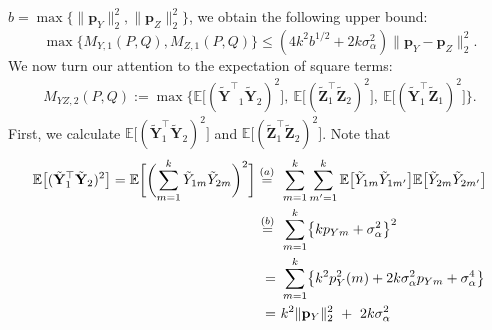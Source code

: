 \documentclass[twoside,11pt]{article}
\newcommand{\rvTwo}{Y}
\newcommand{\rvThree}{Z}
\newcommand{\vectorize}[1]{\mathbf{#1}}
\newcommand{\rvZ}{Z}
\newcommand{\rVecZ}{\vectorize{\rvZ}}
\newcommand{\rVecZPriv}{\tilde{\rVecZ}} %
\newcommand{\mE}{\mathbb{E}} %
\newcommand{\alphabetSize}{k} %
\newcommand{\vectorIndex}{m}
\newcommand{\probVecElement}[2]{p_{{#1}{#2}}}
\newcommand{\probVec}{\mathbf{p}} %
\newcommand{\kernelMoment}{M} %
\newcommand{\dataGenDist}{P}  %
\newcommand{\privacyMechanism}{Q}
\newcommand{\privacyParameter}{\alpha} %
\newcommand{\LapUParam}{\sigma_{\privacyParameter}}
\newcommand{\momentTwosampleVarCondexpY}{\kernelMoment_{\rvTwo,1}(\dataGenDist, \privacyMechanism)}
\newcommand{\momentTwosampleVarCondexpZ}{\kernelMoment_{\rvThree,1}(\dataGenDist, \privacyMechanism)}
\newcommand{\momentTwosampleExpSquare}{\kernelMoment_{\rvTwo \rvThree,2}(\dataGenDist, \privacyMechanism)}
\begin{document}
\begin{appendix}
\begin{itemize}
	${b} = \max\{ \|\probVec_Y\|_2^2, \|\probVec_Z\|_2^2 \}$,
	we obtain the following upper bound:
	\begin{equation}\label{upper_lapu_moment1}
		\max
		\{
		\momentTwosampleVarCondexpY,
		\momentTwosampleVarCondexpZ
		\}
		\leq
		(4{\alphabetSize}^2 {b}^{1/2} + {2\alphabetSize}
		\LapUParam^2) \|\probVec_\rvTwo - \probVec_\rvThree\|_2^2.
	\end{equation}
	We now turn our attention to the expectation of square terms:
	\begin{align*}
		\momentTwosampleExpSquare:=
		\max \bigl\{
		\mE
		\bigl[
		(
		{\tilde{\vectorize{\rvTwo}}^\top }_1
		\tilde{\vectorize{\rvTwo}}_2
		)^2
		\bigr],~
		\mE
		\bigl[
		(
		\tilde{\vectorize{\rvThree}}_1^\top
		\rVecZPriv_2)^2
		\bigr]
		,~
		\mE
		\bigl[
		(
		\tilde{\vectorize{\rvTwo}}_1^\top
		\rVecZPriv_1)^2
		\bigr]
		\bigr\}.
	\end{align*}
	First, we calculate
	$\mE \bigl[(\tilde{\vectorize{\rvTwo}}_1^\top \tilde{\vectorize{\rvTwo}}_2)^2 \bigr]$
	and
	$\mE \bigl[ (
	\tilde{\vectorize{\rvThree}}_1^\top
	\rVecZPriv_2
	)^2\bigr]$.
	Note that
	\begin{align*}
		\mE
		\bigl[
		(\tilde{\vectorize{\rvTwo}}_1^\top \tilde{\vectorize{\rvTwo}}_2)^2
		\bigr]
		= %
		\mE
		\biggl[
		\biggl( 
		\sum_{\vectorIndex=1}^{\alphabetSize}
		\tilde{\rvTwo}_{1 \vectorIndex}
		\tilde{\rvTwo}_{2 \vectorIndex}
		\biggr)^2
		\biggr]
		\stackrel{(a)}{=}\hskip 1.57mm & %
		\sum_{\vectorIndex=1}^{\alphabetSize}
		\sum_{\vectorIndex'=1}^{\alphabetSize}
		\mE
		\bigl[
		\tilde{\rvTwo}_{1 \vectorIndex}
		\tilde{\rvTwo}_{1 \vectorIndex'}
		\bigr]
		\mE
		\bigl[
		\tilde{\rvTwo}_{2 \vectorIndex}
		\tilde{\rvTwo}_{2 \vectorIndex'}
		\bigr]
		\\ \stackrel{(b)}{=}\hskip 1.57mm &
		\sum_{\vectorIndex=1}^{\alphabetSize}
		\bigl\{
		{\alphabetSize} \probVecElement{\rvTwo}{\vectorIndex} + \LapUParam^2
		\bigr\}^2
		\\ =~&
		\sum_{\vectorIndex=1}^{\alphabetSize}
		\bigl\{
		{\alphabetSize}^2 p^2_Y(\vectorIndex)
		+
		2 {\alphabetSize} \LapUParam^2 \probVecElement{\rvTwo}{\vectorIndex}
		+
		\LapUParam^4
		\bigr\}
		\\ = ~&
		{\alphabetSize}^2
		\|\probVec_\rvTwo \|_2^2
		~+~
		2{\alphabetSize} \LapUParam^2

\end{align*}
\end{itemize}
\end{appendix}
\end{document}
